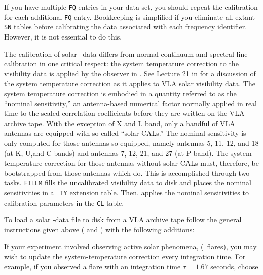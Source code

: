      If you have multiple {\tt FQ} entries in your data set, you
should repeat the calibration for each additional {\tt FQ} entry.
Bookkeeping is simplified if you eliminate all extant {\tt SN} tables
before calibrating the data associated with each frequency identifier.
However, it is not essential to do this.


     The calibration of solar \uv\ data differs from normal continuum
and spectral-line calibration in one critical respect: the system
temperature correction to the visibility data is applied by the
observer in \hbox{\AIPS}.  See Lecture 21 in {\it {}\/} for a discussion of the system
temperature correction as it applies to VLA solar visibility data.
The system temperature correction is embodied in a quantity referred
to as the ``nominal sensitivity,'' an antenna-based numerical factor
normally applied in real time to the scaled correlation coefficients
before they are written on the VLA archive tape.  With the exception
of X and L band, only a handful of VLA antennas are equipped with
so-called ``solar CALs.''  The nominal sensitivity is only computed
for those antennas so-equipped, namely antennas 5, 11, 12, and 18 (at
K, U,and C bands) and antennas 7, 12, 21, and 27 (at P band).  The
system-temperature correction for those antennas without solar CALs
must, therefore, be bootstrapped from those antennas which do.  This
is accomplished through two tasks.  {\tt FILLM} fills the uncalibrated
visibility data to disk and places the nominal sensitivities in a {\tt
TY} extension table.  Then, {\tt {}} applies the nominal
sensitivities to calibration parameters in the {\tt CL} table.


     To load a solar \uv-data file to disk from a VLA archive tape
follow the general instructions given above ( and
) with the following additions:

     If your experiment involved observing active solar phenomena,
(\eg\ flares), you may wish to update the system-temperature
correction every integration time.  For example, if you observed a
flare with an integration time $\tau = 1.67$ seconds, choose

